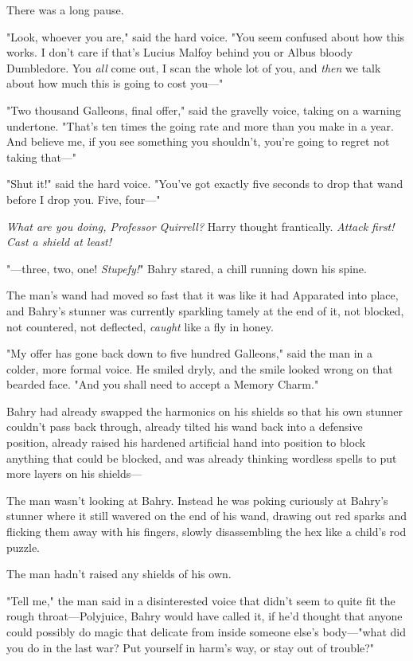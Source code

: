 There was a long pause.

"Look, whoever you are," said the hard voice. "You seem confused about how this
works. I don't care if that's Lucius Malfoy behind you or Albus bloody
Dumbledore. You \emph{all} come out, I scan the whole lot of you, and
\emph{then} we talk about how much this is going to cost you---"

"Two thousand Galleons, final offer," said the gravelly voice, taking on a
warning undertone. "That's ten times the going rate and more than you make in a
year. And believe me, if you see something you shouldn't, you're going to
regret not taking that---"

"Shut it!" said the hard voice. "You've got exactly five seconds to drop that
wand before I drop you. Five, four---"

\emph{What are you doing, Professor Quirrell?} Harry thought frantically.
\emph{Attack first! Cast a shield at least!}

"---three, two, one! \emph{Stupefy!}"
\sbreak
Bahry stared, a chill running down his spine.

The man's wand had moved so fast that it was like it had Apparated into place,
and Bahry's stunner was currently sparkling tamely at the end of it, not
blocked, not countered, not deflected, \emph{caught} like a fly in honey.

"My offer has gone back down to five hundred Galleons," said the man in a
colder, more formal voice. He smiled dryly, and the smile looked wrong on that
bearded face. "And you shall need to accept a Memory Charm."

Bahry had already swapped the harmonics on his shields so that his own stunner
couldn't pass back through, already tilted his wand back into a defensive
position, already raised his hardened artificial hand into position to block
anything that could be blocked, and was already thinking wordless spells
to put more layers on his shields---

The man wasn't looking at Bahry. Instead he was poking curiously at Bahry's
stunner where it still wavered on the end of his wand, drawing out red sparks
and flicking them away with his fingers, slowly disassembling the hex like a
child's rod puzzle.

The man hadn't raised any shields of his own.

"Tell me," the man said in a disinterested voice that didn't seem to quite fit
the rough throat---Polyjuice, Bahry would have called it, if he'd thought that
anyone could possibly do magic that delicate from inside someone else's
body---"what did you do in the last war? Put yourself in harm's way, or stay
out of trouble?"

